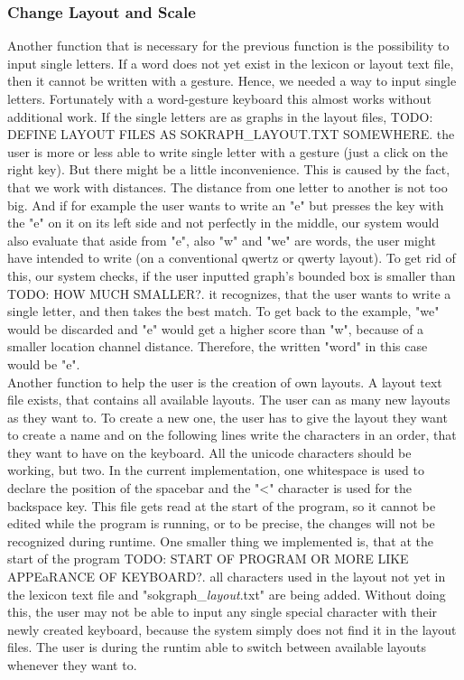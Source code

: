 \subsubsection{Change Layout and Scale}
Another function that is necessary for the previous function is the possibility to input single letters. If a word does not yet exist in the lexicon or layout text file, then it cannot be written with a gesture. Hence, we needed a way to input single letters. Fortunately with a word-gesture keyboard this almost works without additional work. If the single letters are as graphs in the layout files, TODO: DEFINE LAYOUT FILES AS SOKRAPH\_LAYOUT.TXT SOMEWHERE. the user is more or less able to write single letter with a gesture (just a click on the right key). But there might be a little inconvenience. This is caused by the fact, that we work with distances. The distance from one letter to another is not too big. And if for example the user wants to write an "e" but presses the key with the "e" on it on its left side and not perfectly in the middle, our system would also evaluate that aside from "e", also "w" and "we" are words, the user might have intended to write (on a conventional qwertz or qwerty layout). To get rid of this, our system checks, if the user inputted graph's bounded box is smaller than TODO: HOW MUCH SMALLER?. it recognizes, that the user wants to write a single letter, and then takes the best match. To get back to the example, "we" would be discarded and "e" would get a higher score than "w", because of a smaller location channel distance. Therefore, the written "word" in this case would be "e".\\
Another function to help the user is the creation of own layouts. A layout text file exists, that contains all available layouts. The user can as many new layouts as they want to. To create a new one, the user has to give the layout they want to create a name and on the following lines write the characters in an order, that they want to have on the keyboard. All the unicode characters should be working, but two. In the current implementation, one whitespace is used to declare the position of the spacebar and the "<" character is used for the backspace key. This file gets read at the start of the program, so it cannot be edited while the program is running, or to be precise, the changes will not be recognized during runtime. One smaller thing we implemented is, that at the start of the program TODO: START OF PROGRAM OR MORE LIKE APPEaRANCE OF KEYBOARD?. all characters used in the layout not yet in the lexicon text file and "sokgraph\_\textit{layout}.txt" are being added. Without doing this, the user may not be able to input any single special character with their newly created keyboard, because the system simply does not find it in the layout files. The user is during the runtim able to switch between available layouts whenever they want to.\\
